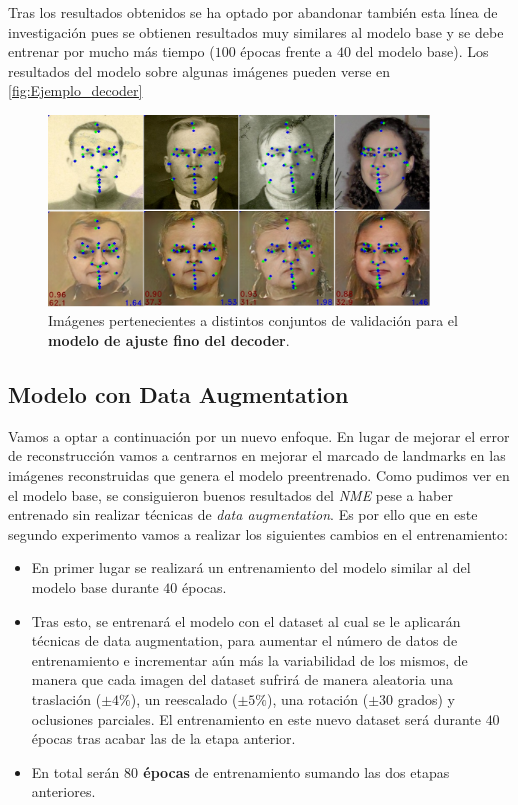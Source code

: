         \medskip

        \noindent Tras los resultados obtenidos se ha optado por abandonar también esta línea de investigación pues se obtienen resultados muy similares al modelo base y se debe entrenar por mucho más tiempo ($100$ épocas frente a $40$ del modelo base). Los resultados del modelo sobre algunas imágenes pueden verse en \autoref{fig:Ejemplo_decoder}

        \begin{figure}[H]
            \centering
            \includegraphics[width=0.9\textwidth]{img/image_decoder.png}
            \caption{Imágenes pertenecientes a distintos conjuntos de validación para el \textbf{modelo de ajuste fino del decoder}.}
            \label{fig:Ejemplo_decoder}
        \end{figure}

    \subsection{Modelo con Data Augmentation}
        \noindent Vamos a optar a continuación por un nuevo enfoque. En lugar de mejorar el error de reconstrucción vamos a centrarnos en mejorar el marcado de landmarks en las imágenes reconstruidas que genera el modelo preentrenado. Como pudimos ver en el modelo base, se consiguieron buenos resultados del \textit{NME} pese a haber entrenado sin realizar técnicas de \textit{data augmentation}. Es por ello que en este segundo experimento vamos a realizar los siguientes cambios en el entrenamiento: 
        
        \begin{itemize}
            \item En primer lugar se realizará un entrenamiento del modelo similar al del modelo base durante $40$ épocas.
            \item Tras esto, se entrenará el modelo con el dataset al cual se le aplicarán técnicas de data augmentation, para aumentar el número de datos de entrenamiento e incrementar aún más la variabilidad de los mismos, de manera que cada imagen del dataset sufrirá de manera aleatoria una traslación ($\pm 4\%$), un reescalado ($\pm 5\%$), una rotación ($\pm 30$ grados) y oclusiones parciales. El entrenamiento en este nuevo dataset será durante $40$ épocas tras acabar las de la etapa anterior.
            \item En total serán \textbf{$80$ épocas} de entrenamiento sumando las dos etapas anteriores.
        \end{itemize}

